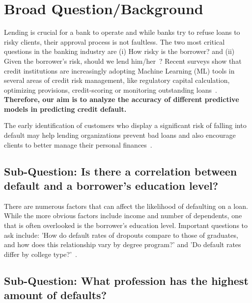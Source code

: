 \author[1]{Tom O'Connell}
\author[2]{Thomas Birkner}
\author[3]{Theyab Alrashidi}


\date{}



\maketitle

\section{Broad Question/Background}

Lending is crucial for a bank to operate and while banks try to refuse loans to risky clients, their approval process is not faultless. The two most critical questions in the banking industry are (i) How risky is the borrower? and (ii) Given the borrower's risk, should we lend him/her~\cite{madaan2021loan}? Recent surveys show that credit institutions are increasingly adopting Machine Learning (ML) tools in several areas of credit risk management, like regulatory capital calculation, optimizing provisions, credit-scoring or monitoring outstanding loans~\cite{alonso2021understanding}. \textbf{Therefore, our aim is to analyze the accuracy of different predictive models in predicting  credit default.} 
 
The early identification of customers who display a significant risk of falling into default may help lending organizations prevent bad loans and also encourage clients to better manage their personal finances~\cite{cocser2019predictive}.


\subsection{Sub-Question: Is there a correlation between default and a borrower's education level?}

There are numerous factors that can affect the likelihood of defaulting on a loan. While the more obvious factors include income and number of dependents, one that is often overlooked is the borrower's education level. Important questions to ask include: 'How do default rates of dropouts compare to those of graduates, and how does this relationship vary by degree program?' and 'Do default rates differ by college type?'~\cite{chakrabarti2017more}.


\subsection{Sub-Question: What profession has the highest amount of defaults?}

